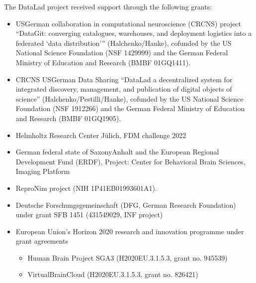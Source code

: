 \sphinxAtStartPar
The DataLad project received support through the following grants:
\begin{itemize}
\item {} 
\sphinxAtStartPar
US\sphinxhyphen{}German collaboration in computational neuroscience (CRCNS) project “DataGit: converging catalogues, warehouses, and deployment logistics into a federated ‘data distribution’” (Halchenko/Hanke), co\sphinxhyphen{}funded by the US National Science Foundation (NSF 1429999) and the German Federal Ministry of Education and Research (BMBF 01GQ1411).

\item {} 
\sphinxAtStartPar
CRCNS US\sphinxhyphen{}German Data Sharing “DataLad \sphinxhyphen{} a decentralized system for integrated discovery, management, and publication of digital objects of science” (Halchenko/Pestilli/Hanke), co\sphinxhyphen{}funded by the US National Science Foundation (NSF 1912266) and the German Federal Ministry of Education and Research (BMBF 01GQ1905).

\item {} 
\sphinxAtStartPar
Helmholtz Research Center Jülich, FDM challenge 2022

\item {} 
\sphinxAtStartPar
German federal state of Saxony\sphinxhyphen{}Anhalt and the European Regional Development Fund (ERDF), Project: Center for Behavioral Brain Sciences, Imaging Platform

\item {} 
\sphinxAtStartPar
ReproNim project (NIH 1P41EB019936\sphinxhyphen{}01A1).

\item {} 
\sphinxAtStartPar
Deutsche Forschungsgemeinschaft (DFG, German Research Foundation) under grant SFB 1451 (431549029, INF project)

\item {} 
\sphinxAtStartPar
European Union’s Horizon 2020 research and innovation programme under grant agreements
\begin{itemize}
\item {} 
\sphinxAtStartPar
Human Brain Project SGA3 (H2020\sphinxhyphen{}EU.3.1.5.3, grant no. 945539)

\item {} 
\sphinxAtStartPar
VirtualBrainCloud (H2020\sphinxhyphen{}EU.3.1.5.3, grant no. 826421)

\end{itemize}

\end{itemize}

